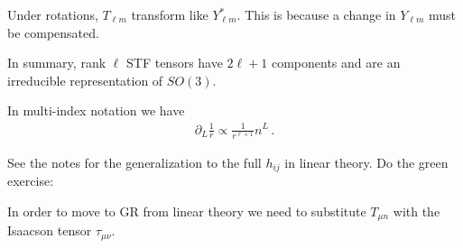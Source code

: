 \documentclass[main.tex]{subfiles}
\begin{document}
Under rotations, \(T_{\ell m}\) transform like \(Y_{\ell m}^{*}\). 
This is because a change in \(Y_{\ell m}\) must be compensated. 

In summary, rank \(\ell\) STF tensors have \(2 \ell + 1\) components and are an irreducible representation of \(SO(3)\). 

In multi-index notation we have 
%
\begin{align}
\partial_{L} \frac{1}{r} \propto \frac{1}{r^{\ell + 1}} n^L
\,.
\end{align}

See the notes for the generalization to the full \(h_{ij}\) in linear theory. 
Do the green exercise: 

In order to move to GR from linear theory we need to substitute \(T_{\mu n }\) with the Isaacson tensor \(\tau_{\mu \nu }\). 

\end{document}
